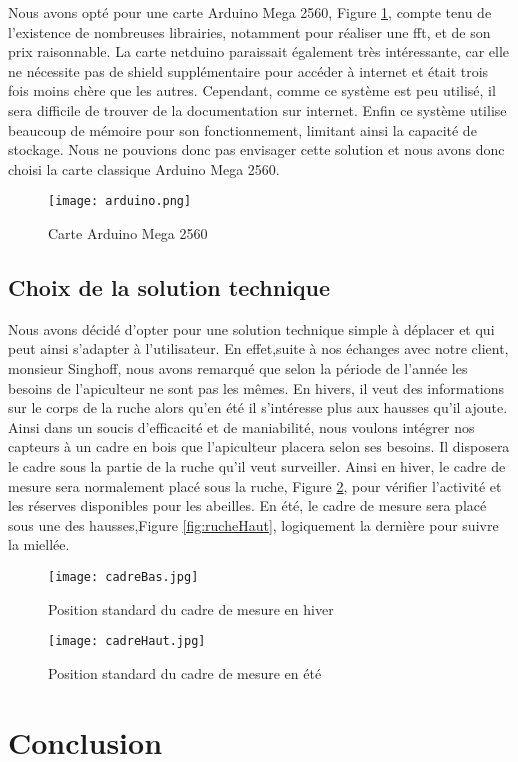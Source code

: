 Nous avons opté pour une carte Arduino Mega 2560, Figure \ref{fig:arduino}, compte tenu de l'existence de nombreuses librairies, notamment pour réaliser une fft, et de son prix raisonnable. La carte netduino paraissait également très intéressante, car elle ne nécessite pas de shield supplémentaire pour accéder à internet et était trois fois moins chère que les autres. Cependant, comme ce système est peu utilisé, il sera difficile de trouver de la documentation sur internet. Enfin ce système utilise beaucoup de mémoire pour son fonctionnement, limitant ainsi la capacité de stockage. Nous ne pouvions donc pas envisager cette solution et nous avons donc choisi la carte classique Arduino Mega 2560.


\begin{figure}[h]
\centering\texttt{[image: arduino.png]}
\caption{\label{fig:arduino} Carte Arduino Mega 2560}
\end{figure} 

\section{Choix de la solution technique}
\vspace{1.5cm}

Nous avons décidé d'opter pour une solution technique simple à déplacer et qui peut ainsi s'adapter à l'utilisateur. En effet,suite à nos échanges avec notre client, monsieur Singhoff, nous avons remarqué que selon la période de l'année les besoins de l'apiculteur ne sont pas les mêmes. En hivers, il veut des informations sur le corps de la ruche alors qu'en été il s'intéresse plus aux hausses qu'il ajoute. Ainsi dans un soucis d'efficacité et de maniabilité, nous voulons intégrer nos capteurs à un cadre en bois que l'apiculteur placera selon ses besoins. Il disposera le cadre sous la partie de la ruche qu'il veut surveiller. Ainsi en hiver, le cadre de mesure sera normalement placé sous la ruche, Figure \ref{fig:rucheBas}, pour vérifier l'activité et les réserves disponibles pour les abeilles. En été, le cadre de mesure sera placé sous une des hausses,Figure \ref{fig:rucheHaut}, logiquement la dernière pour suivre la miellée.
\begin{figure}[h]

\begin{minipage}[c]{.46\linewidth}
     \begin{center}
             \texttt{[image: cadreBas.jpg]}
             \caption{\label{fig:rucheBas} Position standard du cadre de mesure en hiver}
         \end{center}
   \end{minipage} \hfill
   \begin{minipage}[c]{.46\linewidth}
    \begin{center}
            \texttt{[image: cadreHaut.jpg]}
            \caption{\label{fig:rucheBas} Position standard du cadre de mesure en été}
        \end{center}
 \end{minipage}
 \end{figure}


\chapter{Conclusion}
